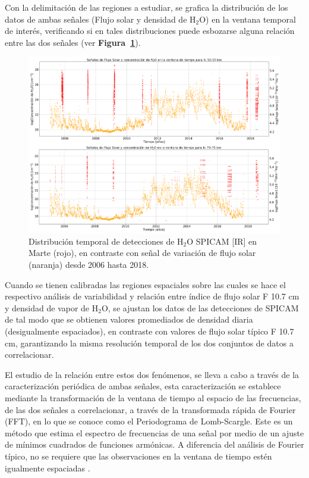 \documentclass[a4paper,alpha-refs]{eSpectra}
\begin{document}
Con la delimitaci\'on de las regiones a estudiar, se grafica la distribuci\'on de los datos de ambas se\~nales (Flujo solar y densidad de H$_2$O) en la ventana temporal de inter\'es, verificando si en tales distribuciones puede esbozarse alguna relación entre las dos se\~nales (ver \textbf{Figura~\ref{fig:dist_H2O_50y70}}).    


\begin{figure}
\vspace*{-10mm} %
\centering
	\includegraphics[width=\textwidth, scale=2]{Imagenes/distribucion_H2O_50y70.png}
    \caption{Distribuci\'on temporal de detecciones de H$_2$O SPICAM [IR] en Marte (rojo), en contraste con se\~nal de variaci\'on de flujo solar (naranja) desde 2006 hasta 2018.}
    \label{fig:dist_H2O_50y70}
\end{figure}


Cuando se tienen calibradas las regiones espaciales sobre las cuales se hace el respectivo an\'alisis de variabilidad y relación entre índice de flujo solar F 10.7 cm y densidad de vapor de H$_2$O, se ajustan los datos de las detecciones de SPICAM de tal modo que se obtienen valores promediados de densidad diaria (desigualmente espaciados), en contraste con valores de flujo solar t\'ipico F 10.7 cm, garantizando la misma resoluci\'on temporal de los dos conjuntos de datos a correlacionar.

El estudio de la relación entre estos dos fenómenos, se lleva a cabo a trav\'es de la caracterizaci\'on peri\'odica de ambas se\~nales, esta caracterizaci\'on se establece mediante la transformaci\'on de la ventana de tiempo al espacio de las frecuencias, de las dos se\~nales a correlacionar, a trav\'es de la transformada r\'apida de Fourier (FFT), en lo que se conoce como el Periodograma de Lomb-Scargle. Este es un m\'etodo que estima el espectro de frecuencias de una se\~nal por medio de un ajuste de m\'inimos cuadrados de funciones arm\'onicas. A diferencia del an\'alisis de Fourier t\'ipico, no se requiere que las observaciones en la ventana de tiempo est\'en igualmente espaciadas \citep{Lomb_1976, scargle_1982}.
\end{document}
